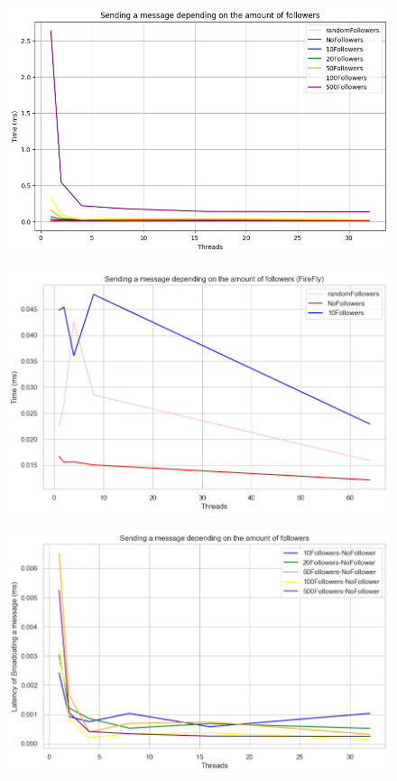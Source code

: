 \documentclass[a4paper]{article}
\begin{document}
\begin{figure}[H]
	\centering
	\includegraphics[width = \linewidth]{Images/SendingMessageLatencyMean.png}
	\caption{}
\end{figure}
\begin{figure}[H]
	\centering
	\includegraphics[width = \linewidth]{Images/SendingMessageLatencyMeanFireFly.png}
	\caption{}
\end{figure}

\begin{figure}[H]
	\centering
	\includegraphics[width = \linewidth]{Images/SendingMessageLatency-Mean.png}
	\caption{}
\end{figure}
\end{document}
